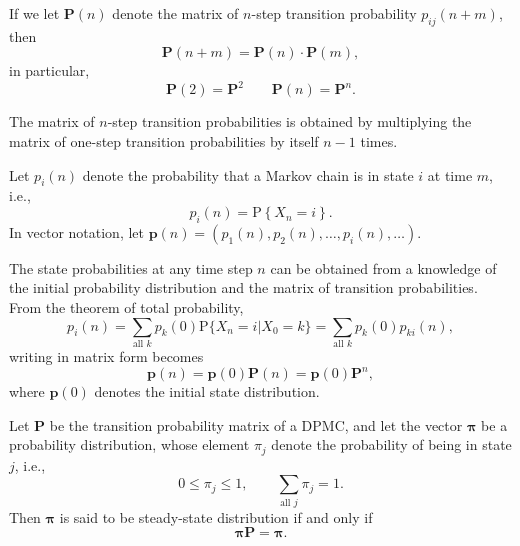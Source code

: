 \documentclass[../Note.tex]{subfiles}
\begin{document}
If we let $\mathbf{P}(n)$ denote the matrix of $n$-step transition probability $p_{ij}(n+m)$, then 
\begin{equation}
    \mathbf{P}(n+m) = \mathbf{P}(n) \cdot \mathbf{P}(m),
\end{equation} 
in particular,
\[
    \mathbf{P}(2) = \mathbf{P}^{2} \qquad \mathbf{P}(n) = \mathbf{P}^{n}.
\]

\begin{remark}
    The matrix of $n$-step transition probabilities is obtained by multiplying the matrix of one-step transition probabilities by itself $n-1$ times.
\end{remark}

Let $p_i(n)$ denote the probability that a Markov chain is in state $i$ at time $m$, i.e.,
\[
    p_i(n) = \mathrm{P} \left\{X_n = i\right\}.
\]
In vector notation, let $\bm{p}(n) = (p_1(n), p_2(n), \dots, p_i(n), \dots)$. 

The state probabilities at any time step $n$ can be obtained from a knowledge of the initial probability distribution and the matrix of transition probabilities. From the theorem of total probability,
\begin{equation}
    p_i(n) = \sum_{\text{all } k} p_k(0) \mathrm{P}\{X_n = i | X_0 = k\} = \sum_{\text{all } k} p_k(0) p_{ki}(n),
\end{equation} 
writing in matrix form becomes
\begin{equation}
    \bm{p}(n) = \bm{p}(0) \mathbf{P}(n) = \bm{p}(0) \mathbf{P}^{n},
\end{equation} 
where $\bm{p}(0)$ denotes the initial state distribution.

\begin{definition}
    Let $\mathbf{P}$ be the transition probability matrix of a DPMC, and let the vector $\bm{\pi}$ be a probability distribution, whose element $\pi_j$ denote the probability of being in state $j$, i.e., 
    \[
        0 \leq \pi_j \leq 1, \qquad \sum_{\text{all } j } \pi_j = 1.
    \]
    Then $\bm{\pi}$ is said to be steady-state distribution if and only if 
    \begin{equation}
        \bm{\pi} \mathbf{P} = \bm{\pi}.
    \end{equation} 
\end{definition} 
\end{document}
